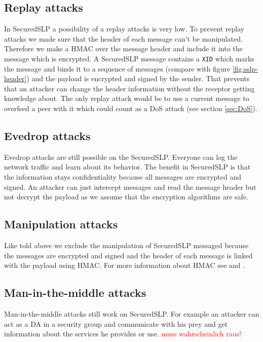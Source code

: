 \subsection{Replay attacks}
In SecuredSLP a possibility of a replay attacks is very low. To prevent replay attacks we made sure that the header of each message can't be manipulated. Therefore we make a HMAC over the message header and include it into the message which is encrypted.  A SecuredSLP message contains a \texttt{XID} which marks the message and binds it to a sequence of messages (compare with figure \ref{fig:sslp-header}) and the payload is encrypted and signed by the sender. That prevents that an attacker can change the header information without the receptor getting knowledge about. The only replay attack would be to use a current message to overfeed a peer with it which could count as a DoS attack (see section \ref{sec:DoS}).

\subsection{Evedrop attacks}
Evedrop attacks are still possible on the SecuredSLP. Everyone can log the network traffic and learn about its behavior. The benefit in SecuredSLP is that the information stays confidentiality because all messages are encrypted and signed. An attacker can just intercept messages and read the message header but not decrypt the payload as we assume that the encryption algorithms are safe.

\subsection{Manipulation attacks}
Like told above we exclude the manipulation of SecuredSLP messaged because the messages are encrypted and signed and the header of each message is linked with the payload using HMAC. For more information about HMAC see \cite{Kraw97} and \cite{Kero00}.

\subsection{Man-in-the-middle attacks}
Man-in-the-middle attacks still work on SecuredSLP. For example an attacker can act as a DA in a security group and communicate with his prey and get information about the services he provides or use. \textcolor{red}{muss wahrscheinlich raus!}